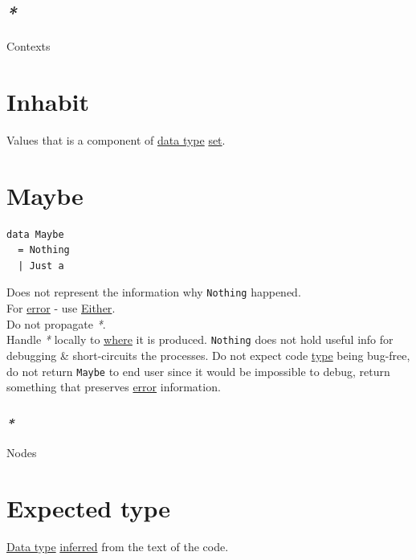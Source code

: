 \documentclass[a4paper,14pt,oneside]{book}
\begin{document}
\subsection{\emph{*}}
\label{sec:orgf9f0d39}

\label{org4d0ac90}Contexts\\

\section{\label{orgddf6f80}Inhabit}
\label{sec:org788d97d}
Values that is a component of \hyperref[org5fd92b4]{data type} \hyperref[orgc6fbcf3]{set}.\\

\section{\label{orgc66adf1}Maybe}
\label{sec:org6302939}
\begin{verbatim}
data Maybe
  = Nothing
  | Just a
\end{verbatim}

Does not represent the information why \texttt{Nothing} happened.\\
For \hyperref[orga8fca48]{error} - use \hyperref[orga1183c5]{Either}.\\
Do not propagate \emph{*}.\\

Handle \emph{*} locally to \hyperref[org12b3f26]{where} it is produced. \texttt{Nothing} does not hold useful info for debugging \& short-circuits the processes. Do not expect code \hyperref[org35b9249]{type} being bug-free, do not return \texttt{Maybe} to end user since it would be impossible to debug, return something that preserves \hyperref[orga8fca48]{error} information.\\

\subsubsection{\emph{*}}
\label{sec:orgc72ae49}

\label{orgeb5136e}Nodes\\

\section{\label{org955762d}Expected type}
\label{sec:org0b8c8d2}
\hyperref[org5fd92b4]{Data type} \hyperref[org0334c71]{inferred} from the text of the code.\\
\end{document}
